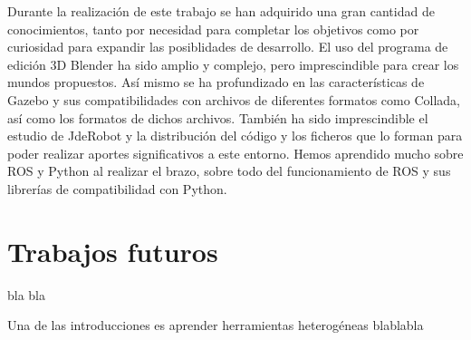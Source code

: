 Durante la realización de este trabajo se han adquirido una gran cantidad de conocimientos, tanto por necesidad para completar los objetivos como por curiosidad para expandir las posiblidades de desarrollo. El uso del programa de edición 3D Blender ha sido amplio y complejo, pero imprescindible para crear los mundos propuestos. Así mismo se ha profundizado en las características de Gazebo y sus compatibilidades con archivos de diferentes formatos como Collada, así como los formatos de dichos archivos. También ha sido imprescindible el estudio de JdeRobot y la distribución del código y los ficheros que lo forman para poder realizar aportes significativos a este entorno. Hemos aprendido mucho sobre ROS y Python al realizar el brazo, sobre todo del funcionamiento de ROS y sus librerías de compatibilidad con Python.


\section{Trabajos futuros}
\label{sec:cn_trabajosfuturos}

bla bla













Una de las introducciones es aprender herramientas heterogéneas  blablabla







